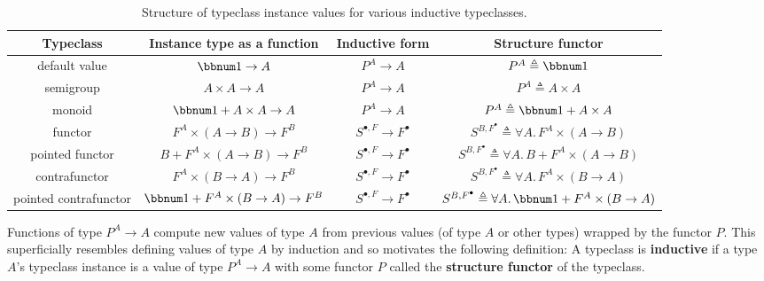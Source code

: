 \begin{table}
\begin{centering}
\begin{tabular}{|c|c|c|c|}
\hline 
\textbf{\small{}Typeclass} & \textbf{\small{}Instance type as a function} & \textbf{\small{}Inductive form} & \textbf{\small{}Structure functor}\tabularnewline
\hline 
\hline 
{\small{}default value} & {\small{}$\bbnum 1\rightarrow A$} & {\small{}$P^{A}\rightarrow A$} & {\small{}$P^{A}\triangleq\bbnum 1$}\tabularnewline
\hline 
{\small{}semigroup} & {\small{}$A\times A\rightarrow A$} & {\small{}$P^{A}\rightarrow A$} & {\small{}$P^{A}\triangleq A\times A$}\tabularnewline
\hline 
{\small{}monoid} & {\small{}$\bbnum 1+A\times A\rightarrow A$} & {\small{}$P^{A}\rightarrow A$} & {\small{}$P^{A}\triangleq\bbnum 1+A\times A$}\tabularnewline
\hline 
{\small{}functor} & {\small{}$F^{A}\times\left(A\rightarrow B\right)\rightarrow F^{B}$} & {\small{}$S^{\bullet,F}\rightarrow F^{\bullet}$} & {\small{}$S^{B,F^{\bullet}}\triangleq\forall A.\,F^{A}\times\left(A\rightarrow B\right)$}\tabularnewline
\hline 
{\small{}pointed functor} & {\small{}$B+F^{A}\times\left(A\rightarrow B\right)\rightarrow F^{B}$} & {\small{}$S^{\bullet,F}\rightarrow F^{\bullet}$} & {\small{}$S^{B,F^{\bullet}}\triangleq\forall A.\,B+F^{A}\times\left(A\rightarrow B\right)$}\tabularnewline
\hline 
{\small{}contrafunctor} & {\small{}$F^{A}\times(B\rightarrow A)\rightarrow F^{B}$} & {\small{}$S^{\bullet,F}\rightarrow F^{\bullet}$} & {\small{}$S^{B,F^{\bullet}}\triangleq\forall A.\,F^{A}\times\left(B\rightarrow A\right)$}\tabularnewline
\hline 
{\small{}pointed contrafunctor} & {\small{}$\bbnum 1+F^{A}\times\left(B\rightarrow A\right)\rightarrow F^{B}$} & {\small{}$S^{\bullet,F}\rightarrow F^{\bullet}$} & {\small{}$S^{B,F^{\bullet}}\triangleq\forall A.\,\bbnum 1+F^{A}\times\left(B\rightarrow A\right)$}\tabularnewline
\hline 
\end{tabular}
\par\end{centering}
\caption{Structure of typeclass instance values for various inductive typeclasses.\label{tab:Types-of-typeclass-instance-values}}

\end{table}

Functions of type $P^{A}\rightarrow A$ compute new values of type
$A$ from previous values (of type $A$ or other types) wrapped by
the functor $P$. This superficially resembles defining values of
type $A$ by induction and so motivates the following definition:
A typeclass is \textbf{inductive}
if a type $A$'s typeclass instance is a value of type $P^{A}\rightarrow A$
with some functor $P$ called the \textbf{structure
functor} of the typeclass. 

